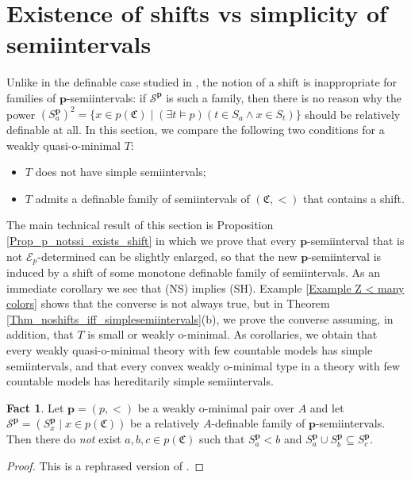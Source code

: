 \documentclass{amsart}
\theoremstyle{definition}
\theoremstyle{definition}
\newtheorem{Fact}[Theorem]{Fact}
\newcommand{\Mon}{\mathfrak C}
\def\pp{\mathbf{p}}
\begin{document}
\section{Existence of shifts vs simplicity of semiintervals}\label{Section 3}  

Unlike in the definable case studied in \cite[Section 6]{MTwqom1}, the notion of a shift is inappropriate for families of $\mathbf p$-semiintervals: if $\mathcal S^\pp$ is such a family, then there is no reason why the power $(S_a^\pp)^2=\{x\in p(\Mon)\mid (\exists t\models p)(t\in S_a\land x\in S_t)\}$ should be relatively definable at all. 
In this section, we compare the following two conditions for a weakly quasi-o-minimal $T$:
\begin{itemize}
    \item[(NS)] $T$ does not have simple semiintervals;
    \item[(SH)] $T$ admits a definable family of semiintervals of $(\Mon,<)$ that contains a shift. 
\end{itemize}
The main technical result of this section is Proposition \ref{Prop_p_notssi_exists_shift} in which we prove that every $\mathbf p$-semiinterval that is not $\mathcal E_p$-determined can be slightly enlarged, so that the new $\mathbf p$-semiinterval is induced by a shift of some monotone definable family of semiintervals. As an immediate corollary we see that (NS) implies (SH).  
Example \ref{Example Z < many colors} shows that the converse is not always true, but in Theorem \ref{Thm_noshifts_iff_simplesemiintervals}(b), we prove the converse assuming, in addition, that $T$ is small or weakly o-minimal.
As corollaries, we obtain that every weakly quasi-o-minimal theory with few countable models has simple semiintervals, and that every convex weakly o-minimal type in a theory with few countable models has hereditarily simple semiintervals. 


 
\begin{Fact}\label{Fact_lemma 3_1 wom}
Let $\mathbf p=(p,<)$ be a weakly o-minimal pair over $A$ and let
$\mathcal S^{\mathbf p}=(S^{\mathbf p}_x\mid x\in p(\Mon))$ be a relatively $A$-definable family of $\mathbf p$-semiintervals. Then there do {\em not} exist $a,b,c\in p(\Mon)$ such that $S^{\mathbf p}_{a}<b$ and $S^{\mathbf p}_{a}\cup S^{\mathbf p}_{b}\subseteq S_{c}^\pp$.  
\end{Fact}
\begin{proof}
    This is a rephrased version of \cite[Lemma 4.1]{MTwom}.
\end{proof}
\end{document}
